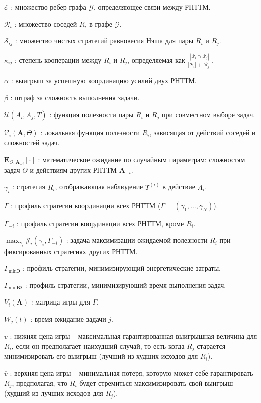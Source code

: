 $\mathcal{E}$ : множество ребер графа $\mathcal{G}$, определяющее связи между РНТТМ.

$\mathcal{R}_i$ : множество соседей $R_i$ в графе $\mathcal{G}$.

$\mathcal{S}_{ij}$ : множество чистых стратегий равновесия Нэша для пары $R_i$ и $R_j$.

$\kappa_{ij}$ : степень кооперации между $R_i$ и $R_j$, определяемая как $\frac{|\mathcal{R}_i \cap \mathcal{R}_j|}{|\mathcal{R}_i| + |\mathcal{R}_j|}$.

$\alpha$ : выигрыш за успешную координацию усилий двух РНТТМ.

$\beta$ : штраф за сложность выполнения задачи.

$\mathcal{U}(A_i, A_j, T)$ : функция полезности пары $R_i$ и $R_j$ при совместном выборе задач.

$\mathcal{V}_i(\mathbf{A}, \Theta)$ : локальная функция полезности $R_i$, зависящая от действий соседей и сложностей задач.

$\mathbf{E}_{\Theta, \mathbf{A}_{-i}}[\cdot]$ : математическое ожидание по случайным параметрам: сложностям задач $\Theta$ и действиям других РНТТМ $\mathbf{A}_{-i}$.

$\gamma_i$ : стратегия $R_i$, отображающая наблюдение $\Upsilon^{(i)}$ в действие $A_i$.

$\Gamma$ : профиль стратегии координации всех РНТТМ ($\Gamma = (\gamma_1, \dotsc, \gamma_N)$).

$\Gamma_{-i}$ : профиль стратегии координации всех РНТТМ, кроме $R_i$.

$\max_{\gamma_i}\mathcal{J}_i(\gamma_i, \Gamma_{-i})$ : задача максимизации ожидаемой полезности $R_i$ при фиксированных стратегиях других РНТТМ.

$\Gamma_{\min\text{Э}}$ : профиль стратегии, минимизирующий энергетические затраты.

$\Gamma_{\min\text{ВЗ}}$ : профиль стратегии, минимизирующий время выполнения задач.

$V_i(\mathbf{A})$ : матрица игры для $\Gamma$.

$W_j(t)$ : время ожидание задачи $j$.

$\underline{v}$ : нижняя цена игры -- максимальная гарантированная выигрышная величина для $R_i$, если он предполагает наихудший случай, то есть когда $R_j$ старается минимизировать его выигрыш (лучший из худших исходов для $R_i$).

$\overline{v}$ : верхняя цена игры -- минимальная потеря, которую может себе гарантировать $R_j$, предполагая, что $R_i$ будет стремиться максимизировать свой выигрыш (худший из лучших исходов для $R_j$).

